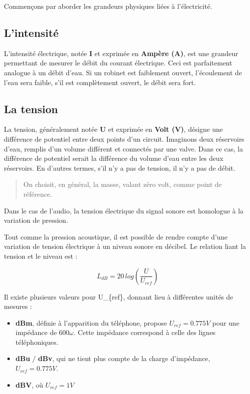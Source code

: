 \documentclass[
  letterpaper,
  DIV=11,
  numbers=noendperiod]{scrreprt}
\providecommand{\tightlist}{%
  \setlength{\itemsep}{0pt}\setlength{\parskip}{0pt}}\usepackage{longtable,booktabs,array}
\begin{document}
Commençons par aborder les grandeurs physiques liées à l'électricité.

\hypertarget{lintensituxe9}{%
\subsection{L'intensité}\label{lintensituxe9}}

L'intensité électrique, notée \textbf{I} et exprimée en \textbf{Ampère
(A)}, est une grandeur permettant de mesurer le débit du courant
électrique. Ceci est parfaitement analogue à un débit d'eau. Si un
robinet est faiblement ouvert, l'écoulement de l'eau sera faible, s'il
est complètement ouvert, le débit sera fort.

\hypertarget{la-tension}{%
\subsection{La tension}\label{la-tension}}

La tension, généralement notée \textbf{U} et exprimée en \textbf{Volt
(V)}, désigne une différence de potentiel entre deux points d'un
circuit. Imaginons deux réservoirs d'eau, remplis d'un volume différent
et connectés par une valve. Dans ce cas, la différence de potentiel
serait la différence du volume d'eau entre les deux réservoirs. En
d'autres termes, s'il n'y a pas de tension, il n'y a pas de débit.

\begin{quote}
On choisit, en général, la masse, valant zéro volt, comme point de
référence.
\end{quote}

Dans le cas de l'audio, la tension électrique du signal sonore est
homologue à la variation de pression.

Tout comme la pression acoustique, il est possible de rendre compte
d'une variation de tension électrique à un niveau sonore en décibel. Le
relation liant la tension et le niveau est :

\[ L_{dB} = 20 \, log (\frac{U}{U_{ref}}) \]

Il existe plusieurs valeurs pour U\_\{ref\}, donnant lieu à différentes
unités de mesures :

\begin{itemize}
\tightlist
\item
  \textbf{dBm}, définie à l'apparition du téléphone, propose
  \(U_{ref} = 0.775 V\) pour une impédance de \(600 \omega\). Cette
  impédance correspond à celle des lignes téléphoniques.
\item
  \textbf{dBu} / \textbf{dBv}, qui ne tient plus compte de la charge
  d'impédance, \(U_{ref} = 0.775 V\).
\item
  \textbf{dBV}, où \(U_{ref} = 1 V\)
\end{itemize}
\end{document}
